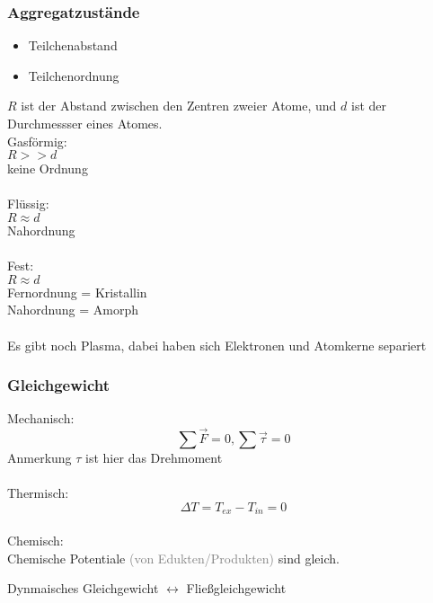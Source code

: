 \documentclass[a4paper]{article}
\begin{document}
\subsubsection{Aggregatzustände}
\begin{itemize}
    \item Teilchenabstand
    \item Teilchenordnung
\end{itemize}
$R$ ist der Abstand zwischen den Zentren zweier Atome, und $d$ ist der Durchmessser eines Atomes.\\
Gasförmig:\\
$R >> d$\\
keine Ordnung\\
\\
Flüssig:\\
$R \approx d$\\
Nahordnung\\
\\
Fest:\\
$R \approx d$\\
Fernordnung = Kristallin\\
Nahordnung = Amorph\\
\\
Es gibt noch Plasma, dabei haben sich Elektronen und Atomkerne separiert\\
\subsubsection{Gleichgewicht}
Mechanisch:
\begin{equation*}
    \sum \vec{F} = 0, \sum \vec{\tau} = 0
\end{equation*}
Anmerkung $\tau$ ist hier das Drehmoment\\\\
Thermisch:
\begin{equation*}
    \Delta T = T_{ex} - T_{in} = 0
\end{equation*}
\\
Chemisch:\\
Chemische Potentiale \textcolor{gray}{(von Edukten/Produkten)} sind gleich.\\
\begin{center}
    Dynmaisches Gleichgewicht $\leftrightarrow$ Fließgleichgewicht
\end{center}
\end{document}
